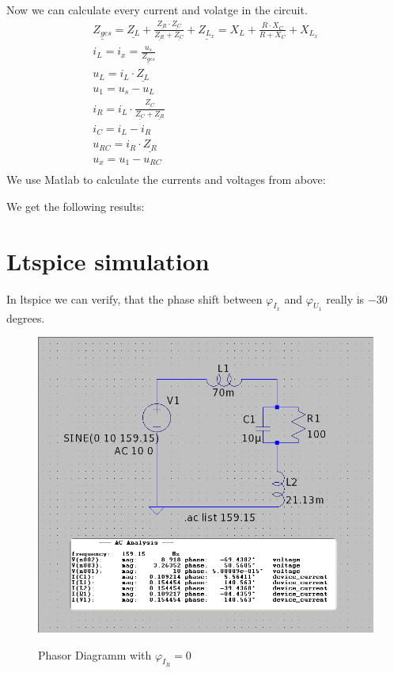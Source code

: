 \documentclass[a4paper]{article}
\begin{document}
\clearpage
Now we can calculate every current and volatge in the circuit.
\begin{align*}
	\underline{Z_{ges}} = \underline{Z_L} + \frac{\underline{Z_R} \cdot \underline{Z_C}}{\underline{Z_R} + \underline{Z_C}} + \underline{Z_{L_x}}
	= X_L + \frac{R \cdot X_C}{R + X_C} + X_{L_x}\\
	i_L = i_x = \frac{u_s}{\underline{Z_{ges}}}\\
	u_L = i_L \cdot \underline{Z_L}\\
	u_1 = u_s - u_L\\
	i_R = i_L \cdot \frac{\underline{Z_C}}{\underline{Z_C} + \underline{Z_R}}\\
	i_C = i_L - i_R\\
	u_{RC} = i_R \cdot \underline{Z_R}\\
	u_x = u_1 - u_{RC}\\
\end{align*}
We use Matlab to calculate the currents and voltages from above:

We get the following results:


\clearpage
\section{Ltspice simulation}
In ltspice we can verify, that the phase shift between $\varphi_{I_{x}}$ and $\varphi_{U_{1}}$
really is $-30$ degrees. \\
\begin{figure}[h!]
	\centering
	\includegraphics[scale=0.55]{./Figures/assignment5_sim_aclist.png}
	\label{sim_1}
	\caption{Phasor Diagramm with $\varphi_{I_{R}} = 0$}
\end{figure}
\end{document}

